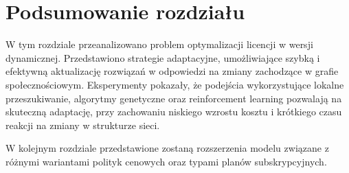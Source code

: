 \section{Podsumowanie rozdziału}

W tym rozdziale przeanalizowano problem optymalizacji licencji w wersji dynamicznej. Przedstawiono strategie adaptacyjne, umożliwiające szybką i efektywną aktualizację rozwiązań w odpowiedzi na zmiany zachodzące w grafie społecznościowym. Eksperymenty pokazały, że podejścia wykorzystujące lokalne przeszukiwanie, algorytmy genetyczne oraz reinforcement learning pozwalają na skuteczną adaptację, przy zachowaniu niskiego wzrostu kosztu i krótkiego czasu reakcji na zmiany w strukturze sieci.

W kolejnym rozdziale przedstawione zostaną rozszerzenia modelu związane z różnymi wariantami polityk cenowych oraz typami planów subskrypcyjnych.
